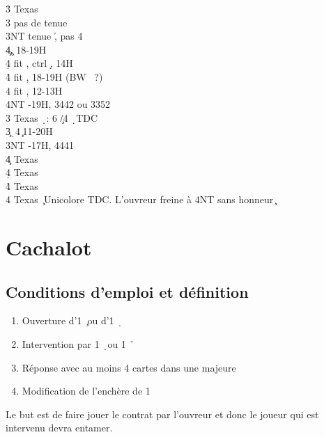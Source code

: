 \documentclass[a4paper]{article}
\begin{document}
\begin{bidtable}
3\h \> Texas \s \+\\
3\s \> pas de tenue \h \\
3NT \> tenue \h , pas 4\s \\
4\c {}\c , 18-19H\\
4\d \> fit \s , ctrl \d , 14H\\
4\h \> fit \s , 18-19H (BW \s\ ?)\\
4\s \> fit \s , 12-13H\\
4NT -19H, 3442 ou 3352\-\\
3\s \> Texas \d\ : 6 \c /4 \d\ TDC\-\\
3\c {}\d\ 4\c\ 11-20H\\
3NT -17H, 4441\+\\
4\c \> Texas \d \\
4\d \> Texas \h \\
4\h \> Texas \s \\
4\s \> Texas \c\ Unicolore TDC. L'ouvreur freine à 4NT sans honneur \c \-
\end{bidtable}

\section{Cachalot}

\subsection{Conditions d'emploi et définition}

\begin{enumerate}
\item Ouverture d’1 \c\ ou d’1 \d\ 

\item Intervention par 1 \d\ ou 1 \h\ 

\item Réponse avec au moins 4 cartes dans une majeure

\item Modification de l’enchère de 1 \s 

\end{enumerate}

Le but est de faire jouer le contrat par l’ouvreur et donc le joueur 
qui est intervenu devra entamer.
\end{document}
